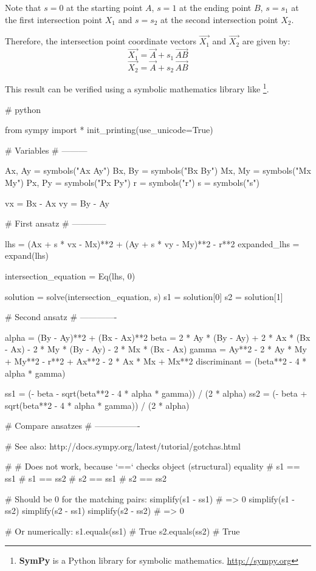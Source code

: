 Note that $s = 0$ at the starting point $A$, $s = 1$ at the ending point $B$, $s = s_1$ at the first intersection point $X_1$ and $s = s_2$ at the second intersection point $X_2$.

Therefore, the intersection point coordinate vectors $\vec{X_1}$ and $\vec{X_2}$ are given by:
\begin{equation}
  \vec{X_1} = \vec{A} + s_1 \, \vec{AB}
\end{equation}
\begin{equation}
  \vec{X_2} = \vec{A} + s_2 \, \vec{AB}
\end{equation}

This result can be verified using a symbolic mathematics library like \footnote{\textbf{SymPy} is a Python library for symbolic mathematics. \url{http://sympy.org}}.


\begin{python}
# python

from sympy import *
init_printing(use_unicode=True)

# Variables
# ---------

Ax, Ay = symbols("Ax Ay")
Bx, By = symbols("Bx By")
Mx, My = symbols("Mx My")
Px, Py = symbols("Px Py")
r = symbols("r")
s = symbols("s")

vx = Bx - Ax
vy = By - Ay

# First ansatz
# ------------

lhs = (Ax + s * vx - Mx)**2 + (Ay + s * vy - My)**2 - r**2
expanded_lhs = expand(lhs)

intersection_equation = Eq(lhs, 0)

solution = solve(intersection_equation, s)
s1 = solution[0]
s2 = solution[1]

# Second ansatz
# -------------

alpha = (By - Ay)**2 + (Bx - Ax)**2
beta = 2 * Ay * (By - Ay) + 2 * Ax * (Bx - Ax) - 2 * My * (By - Ay) - 2 * Mx * (Bx - Ax)
gamma = Ay**2 - 2 * Ay * My + My**2 - r**2 + Ax**2 - 2 * Ax * Mx + Mx**2
discriminant = (beta**2 - 4 * alpha * gamma)

ss1 = (- beta - sqrt(beta**2 - 4 * alpha * gamma)) / (2 * alpha)
ss2 = (- beta + sqrt(beta**2 - 4 * alpha * gamma)) / (2 * alpha)

# Compare ansatzes
# ----------------

# See also: http://docs.sympy.org/latest/tutorial/gotchas.html

# # Does not work, because `==` checks object (structural) equality
# s1 == ss1
# s1 == ss2
# s2 == ss1
# s2 == ss2

# Should be 0 for the matching pairs:
simplify(s1 - ss1)  # => 0
simplify(s1 - ss2)
simplify(s2 - ss1)
simplify(s2 - ss2)  # => 0

# Or numerically:
s1.equals(ss1)  # True
s2.equals(ss2)  # True
\end{python}



